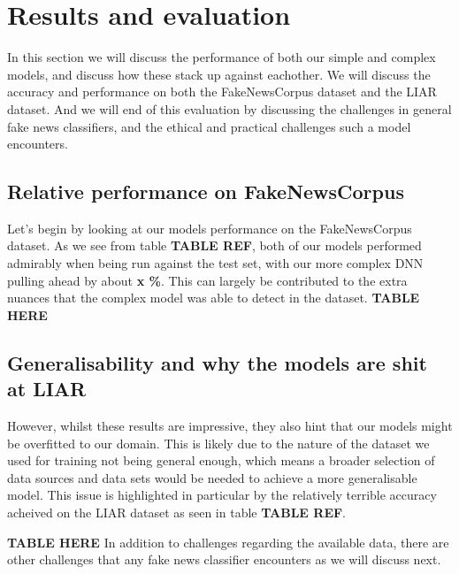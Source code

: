 \section{Results and evaluation}
In this section we will discuss the performance of both our simple and complex models, and discuss how these stack up
against eachother. We will discuss the accuracy and performance on both the FakeNewsCorpus dataset and the LIAR
dataset. And we will end of this evaluation by discussing the challenges in general fake news classifiers, and the
ethical and practical challenges such a model encounters.

\subsection{Relative performance on FakeNewsCorpus}
Let's begin by looking at our models performance on the FakeNewsCorpus dataset. As we see from table \textbf{TABLE REF},
both of our models performed admirably when being run against the test set, with our more complex DNN pulling ahead by
about \textbf{x \%}. This can largely be contributed to the extra nuances that the complex model was able to detect in
the dataset.
\newline
\textbf{TABLE HERE}
\newline

\subsection{Generalisability and why the models are shit at LIAR}
However, whilst these results are impressive, they also hint that our models might be overfitted to our domain. This is
likely due to the nature of the dataset we used for training not being general enough, which means a broader selection
of data sources and data sets would be needed to achieve a more generalisable model. This issue is highlighted in
particular by the relatively terrible accuracy acheived on the LIAR dataset as seen in table \textbf{TABLE REF}.
\newline

\textbf{TABLE HERE}
\newline
In addition to challenges regarding the available data, there are other challenges that any fake news classifier
encounters as we will discuss next.

